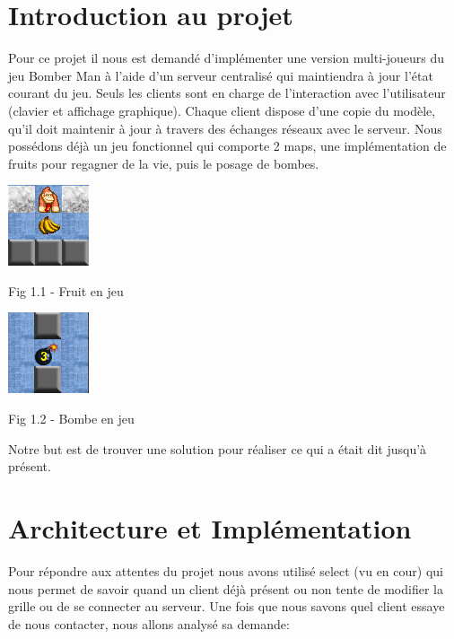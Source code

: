 \documentclass[12pt]{article}
\begin{document}
    \section{Introduction au projet}
    Pour ce projet il nous est demandé d'implémenter une version multi-joueurs du jeu Bomber Man à l'aide d'un serveur centralisé qui maintiendra à jour l'état courant du jeu.
    Seuls les clients sont en charge de l'interaction avec l'utilisateur (clavier et affichage graphique).
    Chaque client dispose d'une copie du modèle, qu'il doit maintenir à jour à travers des échanges réseaux avec le serveur.
    Nous possédons déjà un jeu fonctionnel qui comporte 2 maps, une implémentation de fruits pour regagner de la vie, puis le posage de bombes.
    \begin{center}
        \includegraphics[scale=1]{fruit.png}
    \end{center}
    \begin{center}
        \caption{Fig 1.1 - Fruit en jeu}
    \end{center}
    \begin{center}
        \includegraphics[scale=1]{post_break.png}
    \end{center}
    \begin{center}
        \caption{Fig 1.2 - Bombe en jeu}
    \end{center}
    Notre but est de trouver une solution pour réaliser ce qui a était dit jusqu'à présent.

    \section{Architecture et Implémentation}
    Pour répondre aux attentes du projet nous avons utilisé select (vu en cour) qui nous permet de savoir quand un client déjà présent ou non tente de modifier la grille ou de se connecter au serveur.
    Une fois que nous savons quel client essaye de nous contacter, nous allons analysé sa demande:
\end{document}
